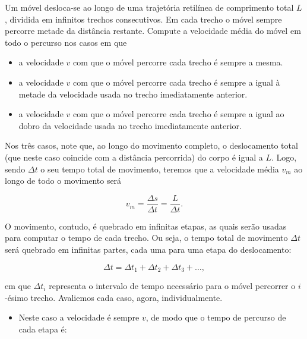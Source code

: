 \begin{exemplo}\label{exemplo_cinematicaescalar_velocidademedia03}

Um móvel desloca-se ao longo de uma trajetória retilínea de comprimento total $L$, dividida em infinitos trechos consecutivos. Em cada trecho o móvel sempre percorre metade da distância restante. Compute a velocidade média do móvel em todo o percurso nos casos em que


\begin{itemize}
  \item [(a)] a velocidade $v$ com que o móvel percorre cada trecho é sempre a mesma.
  
  \item [(b)] a velocidade $v$ com que o móvel percorre cada trecho é sempre a igual à metade da velocidade usada no trecho imediatamente anterior.

  \item [(c)] a velocidade $v$ com que o móvel percorre cada trecho é sempre a igual ao dobro da velocidade usada no trecho imediatamente anterior.
  
\end{itemize}



\resolucao



Nos três casos, note que, ao longo do movimento completo, o deslocamento total (que neste caso coincide com a distância percorrida) do corpo é igual a $L$. Logo, sendo $\Delta t$ o seu tempo total de movimento, teremos que a velocidade média $v_m$ ao longo de todo o movimento será

\begin{equation}
    v_m = \dfrac{\Delta s}{\Delta t} = \dfrac{L}{\Delta t}.
    \label{mecanica_eq_velocidademediaexemplonivelIII}
\end{equation}



O movimento, contudo, é quebrado em infinitas etapas, as quais serão usadas para computar o tempo de cada trecho. Ou seja, o tempo total de movimento $\Delta t$ será quebrado em infinitas partes, cada uma para uma etapa do deslocamento:

$$ \Delta t= \Delta t_1+\Delta t_2+\Delta t_3 + \dots,$$

\noindent em que $\Delta t_i$ representa o intervalo de tempo necessário para o móvel percorrer o $i$-ésimo trecho. Avaliemos cada caso, agora, individualmente.


\begin{itemize}
  \item [(a)] Neste caso a velocidade é sempre $v$, de modo que o tempo de percurso de cada etapa é:


\end{itemize}
\end{exemplo}
